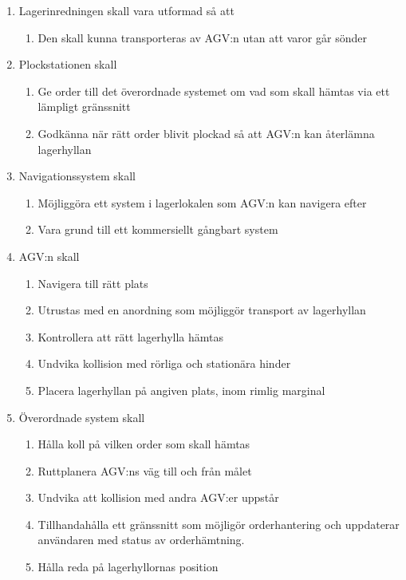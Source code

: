 \documentclass[a4paper,11pt]{article}
\begin{document}
\begin{enumerate}
  \item Lagerinredningen skall vara utformad så att
  \begin{enumerate}
    \item Den skall kunna transporteras av AGV:n utan att varor går sönder
  \end{enumerate}

  \item Plockstationen skall
  \begin{enumerate}
    \item Ge order till det överordnade systemet om vad som skall hämtas
		via ett lämpligt gränssnitt
    \item Godkänna när rätt order blivit plockad så att AGV:n kan återlämna lagerhyllan
  \end{enumerate}

  \item Navigationssystem skall
  \begin{enumerate}
    \item Möjliggöra ett system i lagerlokalen som AGV:n kan navigera efter
	\item Vara grund till ett kommersiellt gångbart system
  \end{enumerate}

  \item AGV:n skall
  \begin{enumerate}
    \item Navigera till rätt plats
    \item Utrustas med en anordning som möjliggör transport av lagerhyllan
    \item Kontrollera att rätt lagerhylla hämtas
    \item Undvika kollision med rörliga och stationära hinder
    \item Placera lagerhyllan på angiven plats, inom rimlig marginal
  \end{enumerate}

  \item Överordnade system skall
  \begin{enumerate}
    \item Hålla koll på vilken order som skall hämtas
    \item Ruttplanera AGV:ns väg till och från målet
    \item Undvika att kollision med andra AGV:er uppstår
	\item Tillhandahålla ett gränssnitt som möjligör orderhantering och
		uppdaterar användaren med status av orderhämtning.
    \item Hålla reda på lagerhyllornas position
  \end{enumerate}
\end{enumerate}
\end{document}
